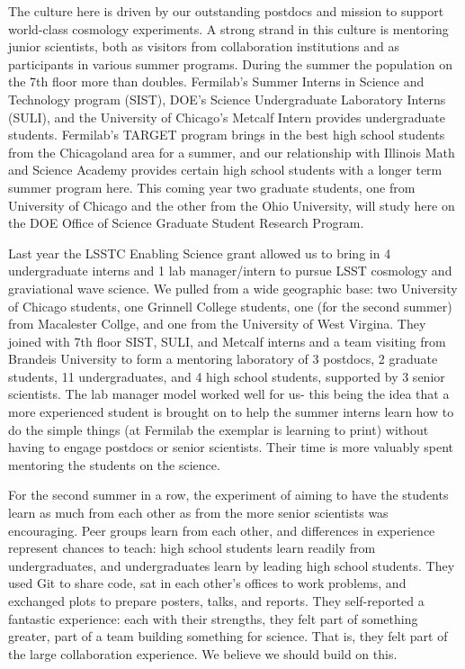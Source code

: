 The culture here is driven by our outstanding postdocs and mission to support
world-class cosmology experiments. A strong strand in this culture is mentoring
junior scientists, both  as visitors from collaboration institutions and as participants
in various summer programs.
During the summer the population on the 7th floor more than doubles.
Fermilab's Summer Interns in Science and Technology program (SIST),
DOE's Science Undergraduate Laboratory Interns (SULI), and the University of
Chicago's Metcalf Intern provides undergraduate students. 
Fermilab's TARGET program brings in the best high school 
students from the Chicagoland area for a summer, 
and our relationship with Illinois Math and Science Academy provides
certain high school students with a longer term summer program here.
This coming year two graduate students, one from University of Chicago and the
other from the Ohio University, will study here on the DOE Office of Science
Graduate Student Research Program.

Last year the LSSTC Enabling Science grant allowed us to bring in
4 undergraduate interns and 1 lab manager/intern to pursue LSST
cosmology and graviational wave science. We pulled from a wide geographic base:
two University of Chicago students, one Grinnell College students, 
one (for the second summer) from Macalester Collge, and
one from the University of West Virgina. They joined with 7th floor SIST, SULI,
and Metcalf interns and a team visiting from Brandeis University to form
a mentoring laboratory of 3 postdocs, 2 graduate students, 11 undergraduates, and 4
high school students,
supported by 3 senior scientists. The lab manager model worked well for us- this
being the idea that a more experienced student is brought on to help the summer interns
learn how to do the simple things (at Fermilab the exemplar is learning to print)
without having to engage postdocs or senior scientists. Their time is more valuably
spent mentoring the students on the science.

For the second summer in a row,
the experiment of aiming to have the students learn as much from each other as from
the more senior scientists was encouraging.
Peer groups learn from each other,
and differences in experience represent chances to teach: high school
students learn readily from undergraduates, and undergraduates learn
by leading high school students. 
They used Git to share code, sat in each other's offices to work problems, and
exchanged plots to prepare posters, talks, and reports. 
They self-reported a fantastic experience: each with their strengths,
they felt part of something greater, part of a team building something 
for science. That is, they felt part of the large collaboration experience.
We believe we should build on this.

